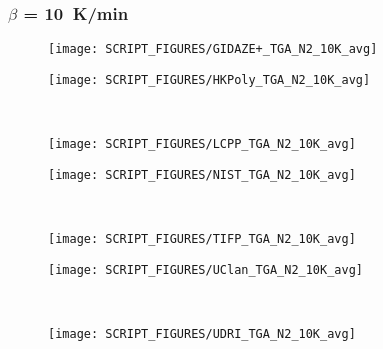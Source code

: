 \begin{landscape}
\subsubsection{$\beta$ = 10~K/min}
\begin{minipage}{0.65\textwidth}
\begin{figure}[H]
{\texttt{[image: SCRIPT\_FIGURES/GIDAZE+\_TGA\_N2\_10K\_avg]}}\\
\end{figure}
\end{minipage} 
\begin{minipage}{0.35\textwidth}
\begin{figure}[H]
{\texttt{[image: SCRIPT\_FIGURES/HKPoly\_TGA\_N2\_10K\_avg]}}\\
\end{figure}
\end{minipage}\\
\begin{minipage}{0.65\textwidth}
\begin{figure}[H]
{\texttt{[image: SCRIPT\_FIGURES/LCPP\_TGA\_N2\_10K\_avg]}}\\
\end{figure}
\end{minipage} 
\begin{minipage}{0.35\textwidth}
\begin{figure}[H]
{\texttt{[image: SCRIPT\_FIGURES/NIST\_TGA\_N2\_10K\_avg]}}\\
\end{figure}
\end{minipage}\\
\begin{minipage}{0.65\textwidth}
\begin{figure}[H]
{\texttt{[image: SCRIPT\_FIGURES/TIFP\_TGA\_N2\_10K\_avg]}}\\
\end{figure}
\end{minipage} 
\begin{minipage}{0.35\textwidth}
\begin{figure}[H]
{\texttt{[image: SCRIPT\_FIGURES/UClan\_TGA\_N2\_10K\_avg]}}\\
\end{figure}
\end{minipage}\\
\begin{minipage}{0.65\textwidth}
\begin{figure}[H]
{\texttt{[image: SCRIPT\_FIGURES/UDRI\_TGA\_N2\_10K\_avg]}}\\

\end{figure}
\end{minipage}
\end{landscape}

